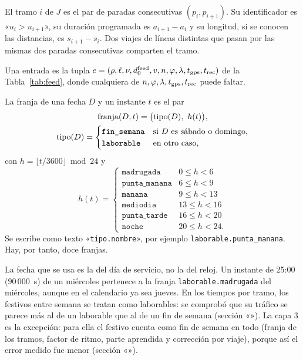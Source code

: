 \begin{definicion}[Tramo]
El tramo $i$ de $J$ es el par de paradas consecutivas $(p_i,p_{i+1})$. Su identificador es «$u_i>u_{i+1}$», su
duración programada es $a_{i+1}-a_i$ y su longitud, si se conocen las distancias, es $s_{i+1}-s_i$. Dos viajes de
líneas distintas que pasan por las mismas dos paradas consecutivas comparten el tramo.
\end{definicion}

\begin{definicion}
Una entrada es la tupla $e=(\rho,\allowbreak\ell,\allowbreak\nu,\allowbreak d_0^{\mathrm{feed}},\allowbreak v,\allowbreak n,\allowbreak\varphi,\allowbreak\lambda,\allowbreak t_{\mathrm{gps}},\allowbreak t_{\mathrm{rec}})$ de la
Tabla~\ref{tab:feed}, donde cualquiera de $n,\varphi,\lambda,t_{\mathrm{gps}},t_{\mathrm{rec}}$ puede faltar.
\end{definicion}

\begin{definicion}[Franja]
\label{def:franja}
La franja de una fecha $D$ y un instante $t$ es el par
\begin{gather*}
\operatorname{franja}(D,t)=\big(\text{tipo}(D),\ h(t)\big),\\
\text{tipo}(D)=\begin{cases}\texttt{fin\_semana}&\text{si $D$ es sábado o domingo},\\ \texttt{laborable}&\text{en otro caso,}\end{cases}
\end{gather*}
con $h=\lfloor t/3600\rfloor \bmod 24$ y
\[
h(t)=\begin{cases}
\texttt{madrugada} & 0\le h<6\\
\texttt{punta\_manana} & 6\le h<9\\
\texttt{manana} & 9\le h<13\\
\texttt{mediodia} & 13\le h<16\\
\texttt{punta\_tarde} & 16\le h<20\\
\texttt{noche} & 20\le h<24.
\end{cases}
\]
Se escribe como texto «\texttt{tipo.nombre}», por ejemplo \texttt{laborable.punta\_manana}. Hay, por tanto, doce
franjas.
\end{definicion}

\begin{observacion}
La fecha que se usa es la del día de servicio, no la del reloj. Un instante de 25:00 ($90\,000$~s) de un miércoles
pertenece a la franja \texttt{laborable.madrugada} del miércoles, aunque en el calendario ya sea jueves. En los tiempos por
tramo, los festivos entre semana se tratan como laborables: se comprobó que su tráfico se parece más al de un laborable
que al de un fin de semana (sección «»). La capa 3 es la excepción: para ella el festivo
cuenta como fin de semana en todo (franja de los tramos, factor de ritmo, parte aprendida y corrección por viaje),
porque así el error medido fue menor (sección «»).
\end{observacion}

